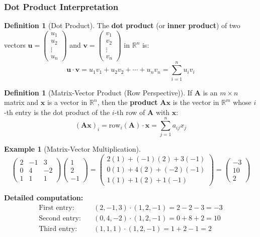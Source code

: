 \documentclass[12pt]{article}
\numberwithin{equation}{section}
\newcommand{\RR}{\mathbb{R}}
\newcommand{\vect}[1]{\boldsymbol{#1}}   %
\newcommand{\mat}[1]{\mathbf{#1}}        %
\theoremstyle{plain}
\theoremstyle{definition}
\newtheorem{definition}[theorem]{Definition}
\newtheorem{example}[theorem]{Example}
\theoremstyle{remark}
\begin{document}
\subsubsection{Dot Product Interpretation}

\begin{definition}[Dot Product]
The \textbf{dot product} (or \textbf{inner product}) of two vectors $\vect{u} = \begin{pmatrix} u_1 \\ u_2 \\ \vdots \\ u_n \end{pmatrix}$ and $\vect{v} = \begin{pmatrix} v_1 \\ v_2 \\ \vdots \\ v_n \end{pmatrix}$ in $\RR^n$ is:
$$\vect{u} \cdot \vect{v} = u_1v_1 + u_2v_2 + \cdots + u_nv_n = \sum_{i=1}^n u_iv_i$$
\end{definition}

\begin{definition}[Matrix-Vector Product (Row Perspective)]
If $\mat{A}$ is an $m \times n$ matrix and $\vect{x}$ is a vector in $\RR^n$, then the \textbf{product} $\mat{A}\vect{x}$ is the vector in $\RR^m$ whose $i$-th entry is the dot product of the $i$-th row of $\mat{A}$ with $\vect{x}$:
$$(\mat{A}\vect{x})_i = \text{row}_i(\mat{A}) \cdot \vect{x} = \sum_{j=1}^n a_{ij}x_j$$
\end{definition}

\begin{example}[Matrix-Vector Multiplication]
$$\begin{pmatrix} 2 & -1 & 3 \\ 0 & 4 & -2 \\ 1 & 1 & 1 \end{pmatrix} \begin{pmatrix} 1 \\ 2 \\ -1 \end{pmatrix} = \begin{pmatrix} 2(1) + (-1)(2) + 3(-1) \\ 0(1) + 4(2) + (-2)(-1) \\ 1(1) + 1(2) + 1(-1) \end{pmatrix} = \begin{pmatrix} -3 \\ 10 \\ 2 \end{pmatrix}$$

\textbf{Detailed computation:}
\begin{align}
\text{First entry:} \quad &(2, -1, 3) \cdot (1, 2, -1) = 2 - 2 - 3 = -3\\
\text{Second entry:} \quad &(0, 4, -2) \cdot (1, 2, -1) = 0 + 8 + 2 = 10\\
\text{Third entry:} \quad &(1, 1, 1) \cdot (1, 2, -1) = 1 + 2 - 1 = 2
\end{align}
\end{example}
\end{document}
